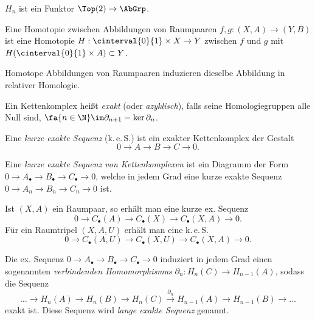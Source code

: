 \documentclass{cheat-sheet}
\newcommand{\CC}[1]{{#1}_{\bullet}} %
\newcommand{\keS}{k.\,e.\,S.} %
\begin{document}
\begin{bem}
  $H_n$ ist ein Funktor $\Top(2) \to \AbGrp$.
\end{bem}

\begin{defn}
  Eine Homotopie zwischen Abbildungen von Raumpaaren $f, g : (X, A) \to (Y, B)$ ist eine Homotopie $H : \cinterval{0}{1} \times X \to Y$ zwischen $f$ und $g$ mit $H(\cinterval{0}{1} \times A) \subset Y$.
\end{defn}

\begin{prop}
  Homotope Abbildungen von Raumpaaren induzieren dieselbe Abbildung in relativer Homologie.
\end{prop}

\begin{defn}
  Ein Kettenkomplex heißt \emph{exakt} (oder \emph{azyklisch}), falls seine Homologiegruppen alle Null sind, \dh{} $\fa{n \in \N} \im \partial_{n+1} = \ker \partial_n$.
\end{defn}

\begin{defn}
  Eine \emph{kurze exakte Sequenz} (\keS{}) ist ein exakter Kettenkomplex der Gestalt
  \[ 0 \to A \to B \to C \to 0. \]
\end{defn}

\begin{defn}
  Eine \emph{kurze exakte Sequenz von Kettenkomplexen} ist ein Diagramm der Form
  $0 \to \CC{A} \to \CC{B} \to \CC{C} \to 0$, welche
  in jedem Grad eine kurze exakte Sequenz
  $0 \to A_n \to B_n \to C_n \to 0$
  ist.
\end{defn}

\begin{bem}
  Ist $(X, A)$ ein Raumpaar, so erhält man eine kurze ex. Sequenz
  \[ 0 \to \CC{C}(A) \to \CC{C}(X) \to \CC{C}(X, A) \to 0. \]
  Für ein Raumtripel $(X, A, U)$ erhält man eine \keS{}
  \[ 0 \to \CC{C}(A, U) \to \CC{C}(X, U) \to \CC{C}(X, A) \to 0. \]
\end{bem}

\begin{prop}
  Die ex. Sequenz $0 \to \CC{A} \to \CC{B} \to \CC{C} \to 0$ induziert in jedem Grad einen sogenannten \emph{verbindenden Homomorphismus} $\partial_n : H_n(C) \to H_{n-1}(A)$, sodass die Sequenz
  \[ \ldots \to H_n(A) \to H_n(B) \to H_n(C) \xrightarrow{\partial_n} H_{n-1}(A) \to H_{n-1}(B) \to \ldots \]
  exakt ist. Diese Sequenz wird \emph{lange exakte Sequenz} genannt.
\end{prop}
\end{document}
